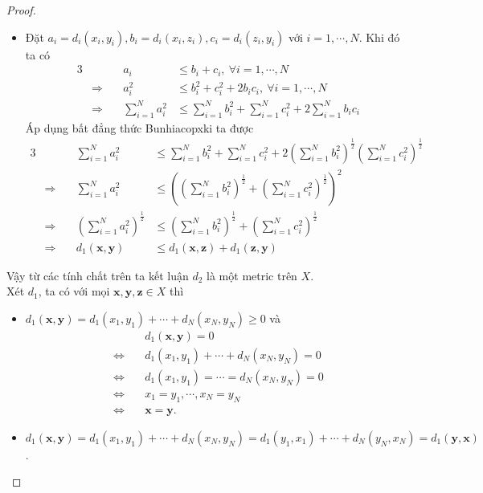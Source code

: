 \begin{proof}
\begin{itemize}
    \item Đặt $a_i = d_i(x_i,y_i), b_i = d_i(x_i,z_i), c_i = d_i(z_i,y_i)$ với $i = 1,\cdots,N$. Khi đó ta có
    \begin{alignat*}{3}
        & & a_i &\leq b_i + c_i,\ \forall i = 1,\cdots,N\\
        &\Rightarrow\quad & a_i^2 &\leq b_i^2 + c_i^2 + 2 b_i c_i,\ \forall i = 1,\cdots,N\\
        &\Rightarrow\quad & \sum_{i=1}^N a_i^2 &\leq \sum_{i=1}^N b_i^2 + \sum_{i=1}^N c_i^2 + 2 \sum_{i=1}^N b_i c_i
    \end{alignat*}
    Áp dụng bất đẳng thức Bunhiacopxki ta được
    \begin{alignat*}{3}
        & & \sum_{i=1}^N a_i^2 &\leq \sum_{i=1}^N b_i^2 + \sum_{i=1}^N c_i^2 + 2 \left(\sum_{i=1}^N b_i^2\right)^{\frac{1}{2}} \left(\sum_{i=1}^N c_i^2\right)^{\frac{1}{2}}\\
        &\Rightarrow\quad & \sum_{i=1}^N a_i^2 &\leq \left(\left(\sum_{i=1}^N b_i^2\right)^{\frac{1}{2}} + \left(\sum_{i=1}^N c_i^2\right)^{\frac{1}{2}}\right)^2\\
        &\Rightarrow\quad & \left(\sum_{i=1}^N a_i^2\right)^{\frac{1}{2}} &\leq \left(\sum_{i=1}^N b_i^2\right)^{\frac{1}{2}} + \left(\sum_{i=1}^N c_i^2\right)^{\frac{1}{2}}\\
        &\Rightarrow\quad & d_1(\mathbf{x},\mathbf{y}) &\leq d_1(\mathbf{x},\mathbf{z}) + d_1(\mathbf{z},\mathbf{y})
    \end{alignat*}
\end{itemize}
Vậy từ các tính chất trên ta kết luận $d_2$ là một metric trên $X$.\QEDFill\\[3mm]
Xét $d_1$, ta có với mọi $\mathbf{x}, \mathbf{y}, \mathbf{z} \in X$ thì
\begin{itemize}
    \item $d_1(\mathbf{x}, \mathbf{y}) = d_1(x_1,y_1) + \cdots + d_N(x_N,y_N) \geq 0$ và
    \begin{align*}
        &\quad d_1(\mathbf{x}, \mathbf{y}) = 0\\
        \Leftrightarrow&\quad d_1(x_1,y_1) + \cdots + d_N(x_N,y_N) = 0\\
        \Leftrightarrow&\quad d_1(x_1,y_1) = \cdots = d_N(x_N,y_N) = 0\\
        \Leftrightarrow&\quad x_1 = y_1, \cdots, x_N = y_N\\
        \Leftrightarrow&\quad \mathbf{x} = \mathbf{y}.
    \end{align*}
    \item $d_1(\mathbf{x}, \mathbf{y}) = d_1(x_1,y_1) + \cdots + d_N(x_N,y_N) = d_1(y_1,x_1) + \cdots + d_N(y_N,x_N) = d_1(\mathbf{y}, \mathbf{x})$.

\end{itemize}
\end{proof}
